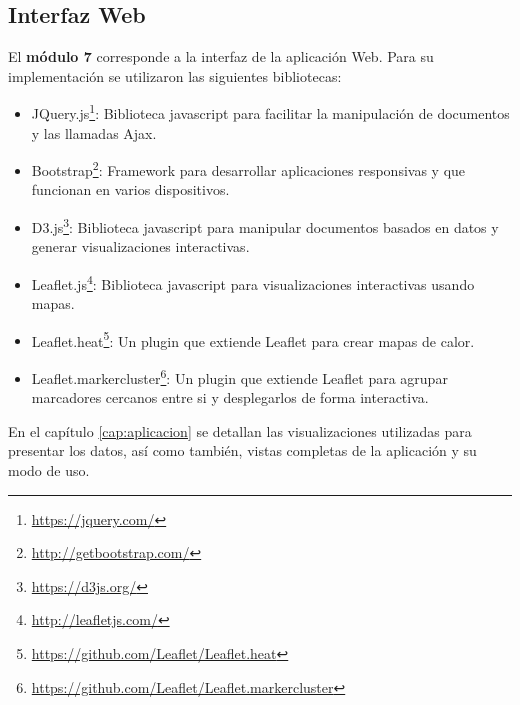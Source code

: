 \subsection{Interfaz Web}
El \textbf{módulo 7} corresponde a la interfaz de la aplicación Web. Para su implementación se utilizaron las siguientes bibliotecas:
\begin{itemize}
\item JQuery.js\footnote{\url{https://jquery.com/}}: Biblioteca javascript para facilitar la manipulación de documentos y las llamadas Ajax. 
\item Bootstrap\footnote{\url{http://getbootstrap.com/}}: Framework para desarrollar aplicaciones responsivas y que funcionan en varios dispositivos.
\item D3.js\footnote{\url{https://d3js.org/}}: Biblioteca javascript para manipular documentos basados en datos y generar visualizaciones interactivas. %
\item Leaflet.js\footnote{\url{http://leafletjs.com/}}: Biblioteca javascript para visualizaciones interactivas usando mapas. 
\item Leaflet.heat\footnote{\url{https://github.com/Leaflet/Leaflet.heat}}: Un plugin que extiende Leaflet para crear mapas de calor. 
\item Leaflet.markercluster\footnote{\url{https://github.com/Leaflet/Leaflet.markercluster}}: Un plugin que extiende Leaflet para agrupar marcadores cercanos entre si y desplegarlos de forma interactiva. 
\end{itemize}

En el capítulo \ref{cap:aplicacion} se detallan las visualizaciones utilizadas para presentar los datos, así como también, vistas completas de la aplicación y su modo de uso. 
